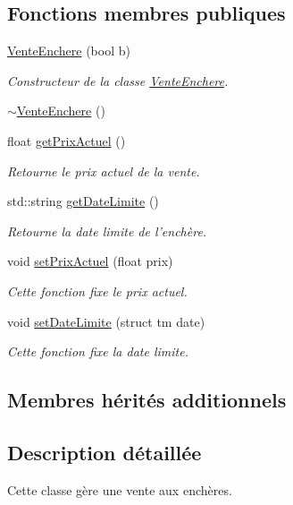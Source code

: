 \subsection*{Fonctions membres publiques}
\begin{DoxyCompactItemize}
\item 
\hyperlink{class_vente_enchere_a383e04cb779ed7a3223b8243a76c13c2}{Vente\-Enchere} (bool b)
\begin{DoxyCompactList}\small\item\em Constructeur de la classe \hyperlink{class_vente_enchere}{Vente\-Enchere}. \end{DoxyCompactList}\item 
\hyperlink{class_vente_enchere_ad2b55c8f2d7cb10f3d124d525c930f9e}{$\sim$\-Vente\-Enchere} ()
\item 
float \hyperlink{class_vente_enchere_a53455121f689127d4daf6123af1668f3}{get\-Prix\-Actuel} ()
\begin{DoxyCompactList}\small\item\em Retourne le prix actuel de la vente. \end{DoxyCompactList}\item 
std\-::string \hyperlink{class_vente_enchere_a2ab7fb32692d9cb1d250b81f0f87dd88}{get\-Date\-Limite} ()
\begin{DoxyCompactList}\small\item\em Retourne la date limite de l'enchère. \end{DoxyCompactList}\item 
void \hyperlink{class_vente_enchere_abad32fe0ea40ea89e1aef1621dc673e6}{set\-Prix\-Actuel} (float prix)
\begin{DoxyCompactList}\small\item\em Cette fonction fixe le prix actuel. \end{DoxyCompactList}\item 
void \hyperlink{class_vente_enchere_a034150f779a519dfc4973a3fcfd0d23e}{set\-Date\-Limite} (struct tm date)
\begin{DoxyCompactList}\small\item\em Cette fonction fixe la date limite. \end{DoxyCompactList}\end{DoxyCompactItemize}
\subsection*{Membres hérités additionnels}


\subsection{Description détaillée}
Cette classe gère une vente aux enchères. 

